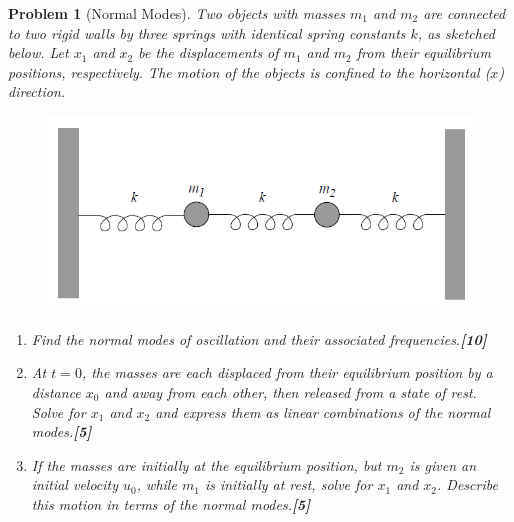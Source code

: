 \documentclass[a4paper]{article}
\theoremstyle{new}
\newtheorem{qns}{Problem}[section]
\begin{document}
\begin{qns}[Normal Modes]
Two objects with masses $m_1$ and $m_2$ are connected to two rigid walls by three springs with identical spring constants $k$, as sketched below. Let $x_1$ and $x_2$ be the displacements of $m_1$ and $m_2$ from their equilibrium positions, respectively. The motion of the objects is confined to the horizontal ($x$) direction. 
\begin{figure}[H]
    \centering
    \includegraphics[scale=0.5]{2013P2Q7.PNG}
\end{figure}
\begin{enumerate}[label=(\roman*)]
\item Find the normal modes of oscillation and their associated frequencies.\hfill\textbf{[10]}
\item At $t = 0$, the masses are each displaced from their equilibrium position by a distance $x_0$ and away from each other, then released from a state of rest. Solve for $x_1$ and $x_2$ and express them as linear combinations of the normal modes.\hfill\textbf{[5]}
\item If the masses are initially at the equilibrium position, but $m_2$ is given an initial velocity $u_0$, while $m_1$ is initially at rest, solve for $x_1$ and $x_2$. Describe this motion in terms of the normal modes.\hfill\textbf{[5]}
\end{enumerate}
\end{qns}
\end{document}
